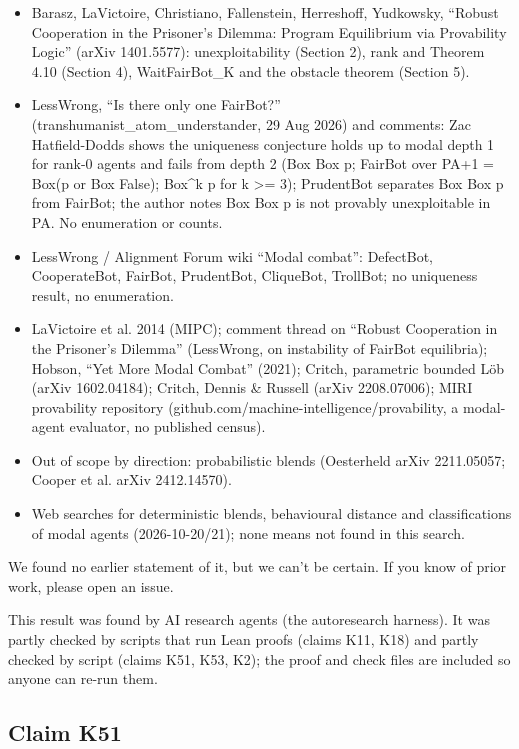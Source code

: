 \documentclass{article}
\begin{document}
\begin{itemize}
\item Barasz, LaVictoire, Christiano, Fallenstein, Herreshoff, Yudkowsky, ``Robust Cooperation in the Prisoner's Dilemma: Program Equilibrium via Provability Logic'' (arXiv 1401.5577): unexploitability (Section 2), rank and Theorem 4.10 (Section 4), WaitFairBot\_K and the obstacle theorem (Section 5).
\item LessWrong, ``Is there only one FairBot?'' (transhumanist\_atom\_understander, 29 Aug 2026) and comments: Zac Hatfield-Dodds shows the uniqueness conjecture holds up to modal depth 1 for rank-0 agents and fails from depth 2 (Box Box p; FairBot over PA+1 = Box(p or Box False); Box\textasciicircum{}k p for k \textgreater{}= 3); PrudentBot separates Box Box p from FairBot; the author notes Box Box p is not provably unexploitable in PA. No enumeration or counts.
\item LessWrong / Alignment Forum wiki ``Modal combat'': DefectBot, CooperateBot, FairBot, PrudentBot, CliqueBot, TrollBot; no uniqueness result, no enumeration.
\item LaVictoire et al. 2014 (MIPC); comment thread on ``Robust Cooperation in the Prisoner's Dilemma'' (LessWrong, on instability of FairBot equilibria); Hobson, ``Yet More Modal Combat'' (2021); Critch, parametric bounded Löb (arXiv 1602.04184); Critch, Dennis \& Russell (arXiv 2208.07006); MIRI provability repository (github.com/machine-intelligence/provability, a modal-agent evaluator, no published census).
\item Out of scope by direction: probabilistic blends (Oesterheld arXiv 2211.05057; Cooper et al. arXiv 2412.14570).
\item Web searches for deterministic blends, behavioural distance and classifications of modal agents (2026-10-20/21); none means not found in this search.
\end{itemize}

We found no earlier statement of it, but we can't be certain. If you know of prior work, please open an issue.

This result was found by AI research agents (the autoresearch harness). It was partly checked by scripts that run Lean proofs (claims K11, K18) and partly checked by script (claims K51, K53, K2); the proof and check files are included so anyone can re-run them.

\subsection*{Claim K51}
\end{document}
